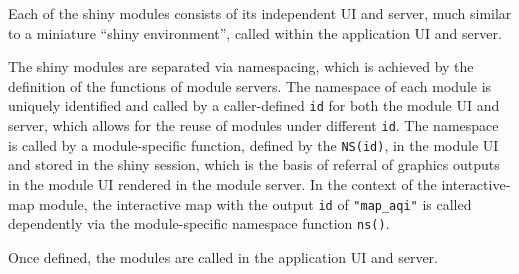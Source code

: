\documentclass{aucklandthesis}
\begin{document}
Each of the shiny modules consists of its independent UI and server, much similar to a miniature ``shiny environment'', called within the application UI and server.

\begin{Shaded}
\begin{Highlighting}[]
\StringTok{ }
\StringTok{ }
  \NormalTok{(}\NormalTok{(}\NormalTok{(}\NormalTok{), } \NormalTok{))}
\NormalTok{\}}

\StringTok{ }
\StringTok{ }
\NormalTok{    output[[}\NormalTok{]] <-}\StringTok{ }
\NormalTok{  \}}
\NormalTok{\}}
\end{Highlighting}
\end{Shaded}

The shiny modules are separated via namespacing, which is achieved by the definition of the functions of module servers. The namespace of each module is uniquely identified and called by a caller-defined \texttt{id} for both the module UI and server, which allows for the reuse of modules under different \texttt{id}. The namespace is called by a module-specific function, defined by the \texttt{NS(id)}, in the module UI and stored in the shiny session, which is the basis of referral of graphics outputs in the module UI rendered in the module server. In the context of the interactive-map module, the interactive map with the output \texttt{id} of \texttt{"map\_aqi"} is called dependently via the module-specific namespace function \texttt{ns()}.

Once defined, the modules are called in the application UI and server.

\begin{Shaded}
\begin{Highlighting}[]
\StringTok{ }
  \NormalTok{(}
\NormalTok{\}}

\StringTok{ }\NormalTok{(}
   \NormalTok{(}
      \NormalTok{(}\NormalTok{(}\NormalTok{(}\NormalTok{))),}
\NormalTok{    ),}
\NormalTok{  )}
\NormalTok{)}
\end{Highlighting}
\end{Shaded}
\end{document}
